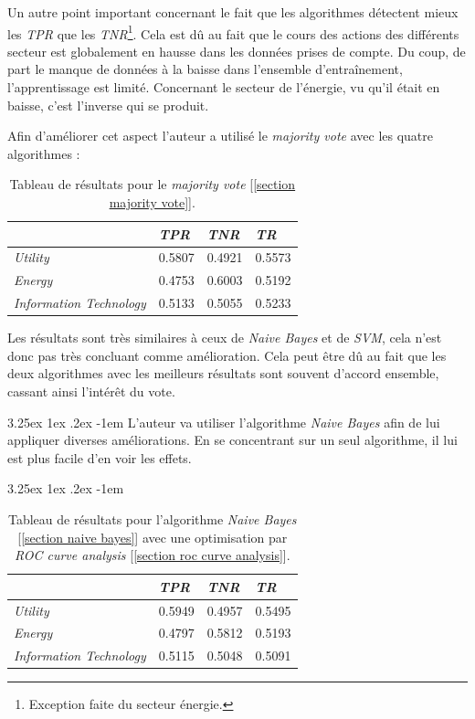 \documentclass[a4paper, 11pt]{article}
\makeatletter
\renewcommand\paragraph{\@startsection{paragraph}{5}{\z@}%
  {3.25ex \@plus1ex \@minus.2ex}%
  {-1em}%
  {\normalfont\normalsize\bfseries}}
\makeatother
\begin{document}
Un autre point important concernant le fait que les algorithmes détectent mieux les \textit{TPR} que les \textit{TNR}\footnote{Exception faite du secteur énergie.}. Cela est dû au fait que le cours des actions des différents secteur est globalement en hausse dans les données prises de compte. Du coup, de part le manque de données à la baisse dans l'ensemble d'entraînement, l'apprentissage est limité. Concernant le secteur de l'énergie, vu qu'il était en baisse, c'est l'inverse qui se produit.

Afin d'améliorer cet aspect l'auteur a utilisé le \textit{majority vote} avec les quatre algorithmes :

\begin{table}[h!]
	\centering
\begin{tabular}{|l|l|l|l|}
	\hline
	\ & \textit{TPR} & \textit{TNR} & \textit{TR}\\
	\hline
	\textit{Utility} & 0.5807 & 0.4921 & 0.5573 \\
	\hline
	\textit{Energy} & 0.4753 & 0.6003 & 0.5192\\
	\hline
	\textit{Information Technology} & 0.5133 & 0.5055 & 0.5233\\
	\hline
\end{tabular}
\caption{Tableau de résultats pour le \textit{majority vote} [\ref{section majority vote}].}
\end{table}

Les résultats sont très similaires à ceux de \textit{Naive Bayes} et de \textit{SVM}, cela n'est donc pas très concluant comme amélioration. Cela peut être dû au fait que les deux algorithmes avec les meilleurs résultats sont souvent d'accord ensemble, cassant ainsi l'intérêt du vote.

\paragraph{}
L'auteur va utiliser l'algorithme \textit{Naive Bayes} afin de lui appliquer diverses améliorations. En se concentrant sur un seul algorithme, il lui est plus facile d'en voir les effets.

\paragraph{}
\begin{table}[h!]
	\centering
\begin{tabular}{|l|l|l|l|}
	\hline
	\ & \textit{TPR} & \textit{TNR} & \textit{TR}\\
	\hline
	\textit{Utility} & 0.5949 & 0.4957 & 0.5495 \\
	\hline
	\textit{Energy} & 0.4797 & 0.5812 & 0.5193\\
	\hline
	\textit{Information Technology} & 0.5115 & 0.5048 & 0.5091\\
	\hline
\end{tabular}
\caption{Tableau de résultats pour l'algorithme \textit{Naive Bayes} [\ref{section naive bayes}] avec une optimisation par \textit{ROC curve analysis} [\ref{section roc curve analysis}].}
\end{table}
\end{document}
